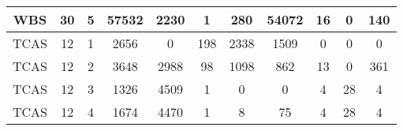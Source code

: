\begin{table*}[]
\begin{tabular}{@{}ccccccccccc@{}}
        WBS                                                      & 30                                                         & 5    & 57532                                                       & 2230                                                                      & 1                                                       & 280                                                        & 54072                                                          & 16                                                        & 0                                                         & 140     \\ \midrule
        TCAS                                                     & 12                                                         & 1    & 2656                                                        & 0                                                                         & 198                                                     & 2338                                                       & 1509                                                           & 0                                                         & 0                                                         & 0       \\ \midrule
        TCAS                                                     & 12                                                         & 2    & 3648                                                        & 2988                                                                      & 98                                                      & 1098                                                       & 862                                                            & 13                                                        & 0                                                         & 361     \\ \midrule
        TCAS                                                     & 12                                                         & 3    & 1326                                                        & 4509                                                                      & 1                                                       & 0                                                          & 0                                                              & 4                                                         & 28                                                        & 4       \\ \midrule
        TCAS                                                     & 12                                                         & 4    & 1674                                                        & 4470                                                                      & 1                                                       & 8                                                          & 75                                                             & 4                                                         & 28                                                        & 4       \\ \midrule

\end{tabular}
\end{table*}
